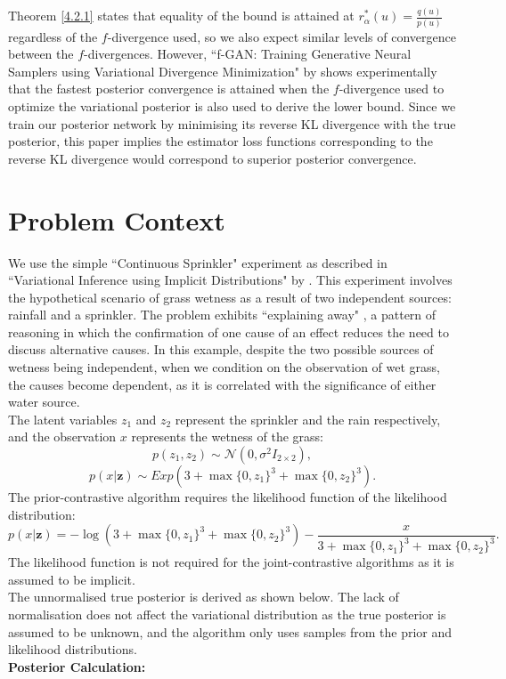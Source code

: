 \documentclass[honours,12pt]{unswthesis}
\numberwithin{equation}{section}
\theoremstyle{definition}
\begin{document}
Theorem \ref{4.2.1} states that equality of the bound is attained at $r^*_\alpha(u)=\frac{q(u)}{p(u)}$ regardless of the $f$-divergence used, so we also expect similar levels of convergence between the $f$-divergences. However, ``f-GAN: Training Generative Neural Samplers using Variational Divergence Minimization" by \citet{nowozin} shows experimentally that the fastest posterior convergence is attained when the $f$-divergence used to optimize the variational posterior is also used to derive the lower bound. Since we train our posterior network by minimising its reverse KL divergence with the true posterior, this paper implies the estimator loss functions corresponding to the reverse KL divergence would correspond to superior posterior convergence.
\section{Problem Context}
We use the simple ``Continuous Sprinkler" experiment as described in ``Variational Inference using Implicit Distributions" by \citet{huszar}. This experiment involves the hypothetical scenario of grass wetness as a result of two independent sources: rainfall and a sprinkler. The problem exhibits ``explaining away" \citep{explain}, a pattern of reasoning in which the confirmation of one cause of an effect reduces the need to discuss alternative causes. In this example, despite the two possible sources of wetness being independent, when we condition on the observation of wet grass, the causes become dependent, as it is correlated with the significance of either water source.\\ 
The latent variables $z_1$ and $z_2$ represent the sprinkler and the rain respectively, and the observation $x$ represents the wetness of the grass:
\[p(z_1,z_2)\sim \mathcal{N} (0,\sigma^2 I_{2\times 2}),\]
\[p(x|\bm{z})\sim Exp(3+\max\{0,z_1\}^3+\max\{0,z_2\}^3).\]
The prior-contrastive algorithm requires the likelihood function of the likelihood distribution:
\[p(x|\bm{z})=-\log (3+\max \{0,z_1\}^3+\max\{0,z_2\}^3)-\frac{x}{3+\max \{0,z_1\}^3+\max\{0,z_2\}^3}.\]
The likelihood function is not required for the joint-contrastive algorithms as it is assumed to be implicit.\\
The unnormalised true posterior is derived as shown below. The lack of normalisation does not affect the variational distribution as the true posterior is assumed to be unknown, and the algorithm only uses samples from the prior and likelihood distributions.\\
\textbf{Posterior Calculation:}
\end{document}
